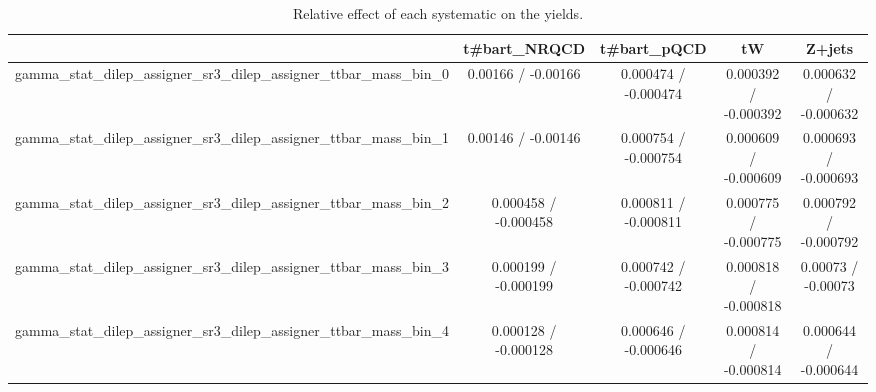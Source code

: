\documentclass[10pt]{article}
\begin{document}
\begin{table}[htbp]
\begin{center}
\begin{tabular}{|c|c|c|c|c|}
\hline 
      & t#bar{t}_{NRQCD}      & t#bar{t}_{pQCD}      & tW      & Z+jets \\ 
\hline 
  gamma_stat_dilep_assigner_sr3_dilep_assigner_ttbar_mass_bin_0 & 0.00166 / -0.00166 & 0.000474 / -0.000474 & 0.000392 / -0.000392 & 0.000632 / -0.000632 \\ 
  gamma_stat_dilep_assigner_sr3_dilep_assigner_ttbar_mass_bin_1 & 0.00146 / -0.00146 & 0.000754 / -0.000754 & 0.000609 / -0.000609 & 0.000693 / -0.000693 \\ 
  gamma_stat_dilep_assigner_sr3_dilep_assigner_ttbar_mass_bin_2 & 0.000458 / -0.000458 & 0.000811 / -0.000811 & 0.000775 / -0.000775 & 0.000792 / -0.000792 \\ 
  gamma_stat_dilep_assigner_sr3_dilep_assigner_ttbar_mass_bin_3 & 0.000199 / -0.000199 & 0.000742 / -0.000742 & 0.000818 / -0.000818 & 0.00073 / -0.00073 \\ 
  gamma_stat_dilep_assigner_sr3_dilep_assigner_ttbar_mass_bin_4 & 0.000128 / -0.000128 & 0.000646 / -0.000646 & 0.000814 / -0.000814 & 0.000644 / -0.000644 \\ 
\hline 
\end{tabular} 
\caption{Relative effect of each systematic on the yields.} 
\end{center} 
\end{table} 
\end{document}
